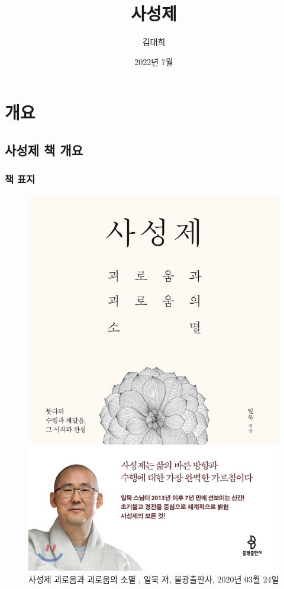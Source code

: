 \documentclass[12pt, a4paper, oneside]{book}
\begin{document}
	
			\dominitoc
			

			\title{사성제}
			\author{김대희}
			\date{2022년 7월}
			\maketitle


			\tableofcontents
			\listoftables
			\listoffigures

			
	\part{개요}



	\newpage
	\chapter{사성제 책 개요}

		\minitoc				%


		\newpage
		\minitoc				%

	\newpage  \null
	\section{책 표지}

		\begin{figure}[!h]
		\centering
		\includegraphics[width=0.6\columnwidth]{./fig/XL.jpg}
		\caption{	사성제 괴로움과 괴로움의 소멸 , 일묵 저, 불광출판사, 2020년 03월 24일}
		\label{fig:figure1}
		\end{figure}
\end{document}
